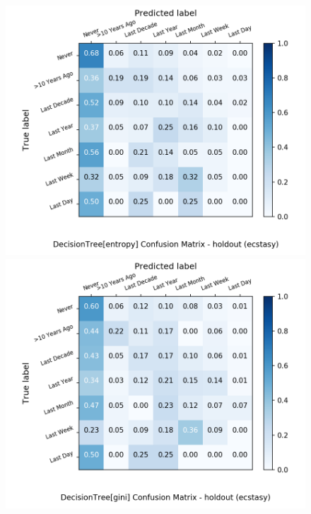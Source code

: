 \begin{figure}[H]
	\centering
	\begin{minipage}[b]{0.32\textwidth}
		\includegraphics[width=1.1\textwidth]{Plots/ecstasy_DecisionTree_entropy_balance_False_holdout.png}
	\end{minipage}
	\begin{minipage}[b]{0.32\textwidth}
		\includegraphics[width=1.1\textwidth]{Plots/ecstasy_DecisionTree_gini_balance_False_holdout.png}
	\end{minipage}
	\begin{minipage}[b]{0.32\textwidth}

\end{minipage}
\end{figure}
